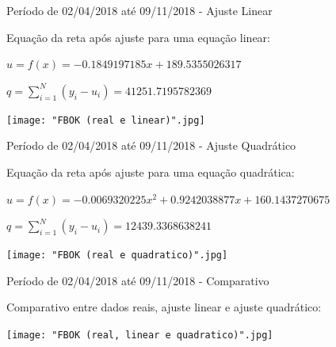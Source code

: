 \documentclass[10pt]{beamer}
\begin{document}
\begin{frame}{Período de 02/04/2018 até 09/11/2018 - Ajuste Linear}

  Equação da reta após ajuste para uma equação linear:
  \begin{center}
  $u = f(x) = -0.1849197185x + 189.5355026317$
  
  $q = \sum_{i=1}^{N} (y_{i}-u_{i}) = 41251.7195782369$
  \end{center}
  
  \begin{center}
    \texttt{[image: "FBOK (real e linear)".jpg]}
  \end{center}
\end{frame}

\begin{frame}{Período de 02/04/2018 até 09/11/2018 - Ajuste Quadrático}

  Equação da reta após ajuste para uma equação quadrática:
  \begin{center}
  $u = f(x) = -0.0069320225x^2 + 0.9242038877x + 160.1437270675$
  
  $q = \sum_{i=1}^{N} (y_{i}-u_{i}) = 12439.3368638241$
  \end{center}
  
  \begin{center}
    \texttt{[image: "FBOK (real e quadratico)".jpg]}
  \end{center}
\end{frame}


\begin{frame}{Período de 02/04/2018 até 09/11/2018 - Comparativo}

  Comparativo entre dados reais, ajuste linear e ajuste quadrático:
  
  \begin{center}
    \texttt{[image: "FBOK (real, linear e quadratico)".jpg]}
  \end{center}
\end{frame}
\end{document}
